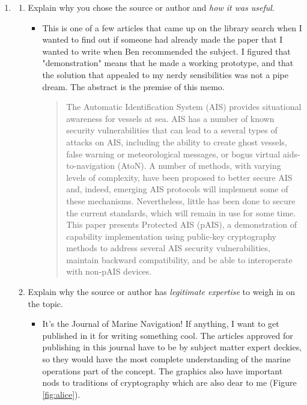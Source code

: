 \documentclass[12pt]{texMemo} %
\begin{document}
\begin{enumerate}
\begin{enumerate}
\begin{itemize}
        \end{itemize}
\end{enumerate}
 \item {}
    \begin{enumerate}
    \item Explain why you chose the source or author and \emph{how it was useful}.
        \begin{itemize}
            \item This is one of a few articles that came up on the library search when I wanted to find out if someone had already made the paper that I wanted to write when Ben recommended the subject. I figured that "demonstration" means that he made a working prototype, and that the solution that appealed to my nerdy sensibilities was not a pipe dream. The abstract is the premise of this memo. \begin{quote}
                The Automatic Identification System (AIS) provides situational awareness for vessels at sea. AIS has a number of known security vulnerabilities that can lead to a several types of attacks on AIS, including the ability to create ghost vessels, false warning or meteorological messages, or bogus virtual aids-to-navigation (AtoN). A number of methods, with varying levels of complexity, have been proposed to better secure AIS and, indeed, emerging AIS protocols will implement some of these mechanisms. Nevertheless, little has been done to secure the current standards, which will remain in use for some time. This paper presents Protected AIS (pAIS), a demonstration of capability implementation using public-key cryptography methods to address several AIS security vulnerabilities, maintain backward compatibility, and be able to interoperate with non-pAIS devices. \parencite[279]{kessler_protected_2020}
            \end{quote}
        \end{itemize}
    \item Explain why the source or author has \emph{legitimate expertise} to weigh in on the topic.
        \begin{itemize}
            \item It's the Journal of Marine Navigation! If anything, I want to get published in it for writing something cool. The articles approved for publishing in this journal have to be by subject matter expert deckies, so they would have the most complete understanding of the marine operations part of the concept. The graphics also have important nods to traditions of cryptography which are also dear to me (Figure \ref{fig:alice}). 
            

\end{itemize}
\end{enumerate}
\end{enumerate}
\end{document}
